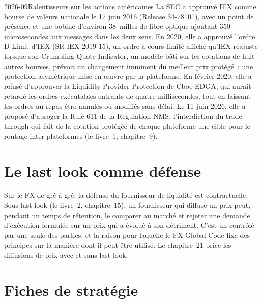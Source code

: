 \begin{dated}{2026-09}{Ralentisseurs sur les actions américaines}\label{dat:hf:latency-arbitrage-and-its-defence:bumps}
La SEC a approuvé IEX comme bourse de valeurs nationale le 17 juin 2016 (Release 34-78101), avec un point de présence et une bobine d'environ 38~milles de
fibre optique ajoutant 350 microsecondes aux messages dans les deux sens. En 2020, elle a approuvé l'ordre D-Limit d'IEX (SR-IEX-2019-15), un ordre à cours limité affiché
qu'IEX réajuste lorsque son Crumbling Quote Indicator, un modèle bâti sur les cotations de huit autres bourses, prévoit un changement imminent du
meilleur prix protégé~: une protection asymétrique mise en œuvre par la plateforme. En février 2020, elle a refusé d'approuver la Liquidity Provider Protection de Cboe EDGA, qui
aurait retardé les ordres exécutables entrants de quatre millisecondes, tout en laissant les ordres au repos être annulés ou modifiés sans délai. Le 11 juin
2026, elle a proposé d'abroger la Rule 611 de la Regulation NMS, l'interdiction du trade-through qui fait de la cotation protégée de chaque plateforme une cible pour
le routage inter-plateformes (le livre~1, chapitre~9).
\end{dated}

\section{Le last look comme défense}

Sur le FX de gré à gré, la défense du fournisseur de liquidité est contractuelle. Sous last look (le livre~2, chapitre~15), un fournisseur qui diffuse un prix
peut, pendant un temps de rétention, le comparer au marché et rejeter une demande d'exécution formulée sur un prix qui a évolué à son détriment. C'est un  contrôlé par une seule des parties, et la raison pour laquelle le FX Global Code fixe des principes sur la manière dont il peut être utilisé. Le chapitre~21 price les diffusions de prix avec et sans last look.

\section{Fiches de stratégie}

